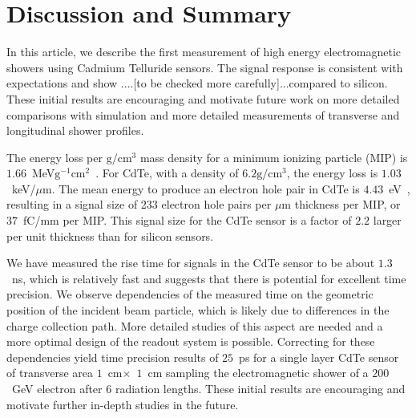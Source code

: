 \documentclass[preprint,1p]{elsarticle}
\begin{document}

\section{Discussion and Summary}
\label{sec:summary} 


In this article, we describe the first measurement of high energy 
electromagnetic showers using Cadmium Telluride sensors. The signal response
is consistent with expectations and show ....[to be checked more carefully]...compared to silicon.
These initial results are encouraging and motivate future work on 
more detailed comparisons with simulation and more detailed 
measurements of transverse and longitudinal shower profiles.


The energy loss per $\mathrm{g}/\mathrm{cm}^{3}$ mass density 
for a minimum ionizing particle (MIP) is $1.66$~MeV$\mathrm{g}^{-1}\mathrm{cm}^{2}$~\cite{PDG}. 
For CdTe, with a density of $6.2\mathrm{g}/\mathrm{cm}^{3}$, the energy
loss is $1.03$~keV/$\mu$m. The mean energy to produce an electron hole pair
in CdTe is $4.43$~eV~\cite{Sze,Singh}, resulting in a signal size of
233 electron hole pairs per $\mu$m thickness per MIP, or $37$~fC/mm per
MIP. This signal size for the CdTe sensor is a factor of $2.2$ larger per unit thickness
than for silicon sensors. 




We have measured the rise time for signals in the CdTe sensor to be about $1.3$~ns, which
is relatively fast and suggests that there is potential for excellent time precision.
We observe dependencies of the measured time on the geometric position of the
incident beam particle, which is likely due to differences in the charge collection
path. More detailed studies of this aspect are needed and a more optimal design of the 
readout system is possible. Correcting for these dependencies yield time precision results
of $25$~ps for a single layer CdTe sensor of transverse area $1$~cm$\times$~$1$~cm
sampling the electromagnetic shower of a $200$~GeV electron after $6$ radiation lengths. 
These initial results are encouraging and motivate further in-depth studies in the
future.
\end{document}
